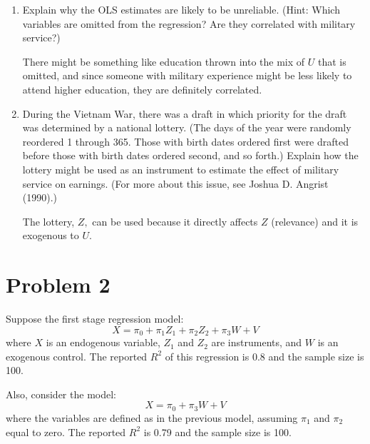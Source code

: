 \documentclass[11pt]{article}
\begin{document}
\begin{enumerate}
\begin{enumerate}
    \item Explain why the OLS estimates are likely to be unreliable. (Hint: Which variables are omitted from the regression? Are they correlated with military service?)
    \begin{solution}
        There might be something like education thrown into the mix of $U$ that is omitted, and since someone with military experience might be less likely to attend higher education, they are definitely correlated. 
    \end{solution}
    \item During the Vietnam War, there was a draft in which priority for the draft was determined by a national lottery. (The days of the year were randomly reordered 1 through 365. Those with birth dates ordered first were drafted before those with birth dates ordered second, and so forth.)  
    Explain how the lottery might be used as an instrument to estimate the effect of military service on earnings. (For more about this issue, see Joshua D. Angrist (1990).)
    \begin{solution}
        The lottery, $Z,$ can be used because it directly affects $Z$ (relevance) and it is exogenous to $U.$ 
    \end{solution}
\end{enumerate}
\end{enumerate}

\newpage
\section*{Problem 2}
Suppose the first stage regression model:
\[
X = \pi_0 + \pi_1 Z_1 + \pi_2 Z_2 + \pi_3 W + V
\]
where \( X \) is an endogenous variable, \( Z_1 \) and \( Z_2 \) are instruments, and \( W \) is an exogenous control. The reported \( R^2 \) of this regression is 0.8 and the sample size is 100.

Also, consider the model:
\[
X = \pi_0 + \pi_3 W + V
\]
where the variables are defined as in the previous model, assuming \( \pi_1 \) and \( \pi_2 \) equal to zero. The reported \( R^2 \) is 0.79 and the sample size is 100.
\end{document}
